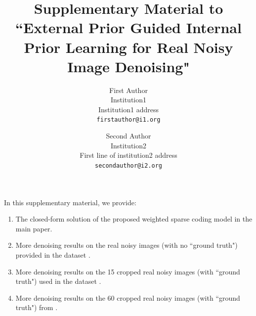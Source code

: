 \documentclass[10pt,onecolumn,letterpaper]{article}
\begin{document}
\title{Supplementary Material to ``External Prior Guided Internal Prior Learning for Real Noisy Image Denoising"}

\author{First Author\\
Institution1\\
Institution1 address\\
{\tt\small firstauthor@i1.org}
\and
Second Author\\
Institution2\\
First line of institution2 address\\
{\tt\small secondauthor@i2.org}
}

\maketitle


In this supplementary material, we provide:\vspace{-0.1in}
\begin{enumerate}
\item The closed-form solution of the proposed weighted sparse coding model in the main paper.
\vspace{-0.1in}
\item More denoising results on the real noisy images (with no ``ground truth") provided in the dataset \cite{ncwebsite}.
\vspace{-0.1in}
\item More denoising results on the 15 cropped real noisy images (with ``ground truth") used in the dataset \cite{crosschannel2016}.
\vspace{-0.1in}
\item More denoising results on the 60 cropped real noisy images (with ``ground truth") from \cite{crosschannel2016}.
\end{enumerate}
\end{document}
